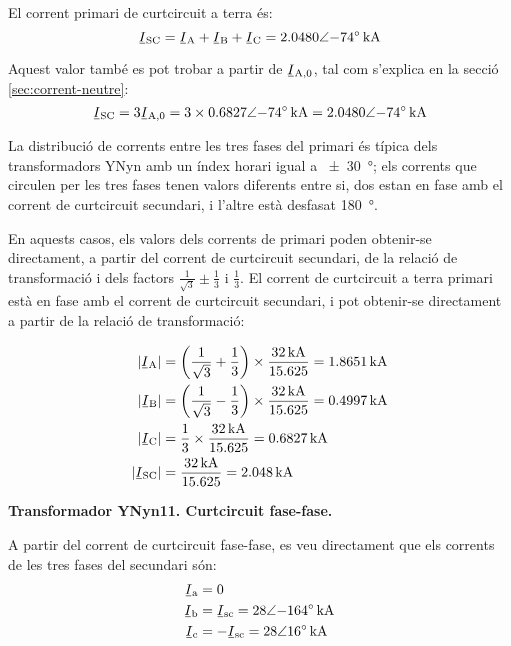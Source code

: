 \begin{exemple}[\CCasimSecTrafo{}]
    El corrent primari de curtcircuit a terra és:
    \[
        \cmplx{I}\ped{SC} = \cmplx{I}\ped{A} + \cmplx{I}\ped{B} + \cmplx{I}\ped{C} = \complexqty{2,0480:-74}{kA}
    \]

    Aquest valor també es pot trobar a partir de $\cmplx{I}\ped{A,0}$, tal com s'explica en la secció \vref{sec:corrent-neutre}:
       \[
        \cmplx{I}\ped{SC} = 3 \cmplx{I}\ped{A,0} = 3 \times \complexqty{0,6827:-74}{kA} = \complexqty{2,0480:-74}{kA}
    \]

    La distribució de corrents entre les tres fases del primari és típica dels transformadors YNyn amb un índex horari igual a \qty{+-30}{\degree}; els corrents que circulen per les tres fases tenen valors diferents entre si, dos estan en fase amb el corrent de curtcircuit secundari, i l'altre està desfasat \qty{180}{\degree}.

    En aquests casos, els valors dels corrents de primari poden obtenir-se directament, a partir del corrent de curtcircuit secundari, de la relació de transformació i dels factors $\frac{1}{\sqrt{3}} \pm \frac{1}{3}$ i $\frac{1}{3}$. El corrent de curtcircuit a terra primari està en fase amb el corrent de curtcircuit secundari, i pot obtenir-se directament a partir de la relació de transformació:
    
    \begin{align*}
        |\cmplx{I}\ped{A}| &= \left(\frac{1}{\sqrt{3}}+\frac{1}{3}\right) \times \frac{\qty{32}{kA}}{\num{15,625}} = \qty{1,8651}{kA} \\
        |\cmplx{I}\ped{B}| &= \left(\frac{1}{\sqrt{3}}-\frac{1}{3}\right) \times \frac{\qty{32}{kA}}{\num{15,625}} = \qty{0,4997}{kA} \\
        |\cmplx{I}\ped{C}| &= \frac{1}{3} \times \frac{\qty{32}{kA}}{\num{15,625}} = \qty{0,6827}{kA} \\
        |\cmplx{I}\ped{SC}| &= \frac{\qty{32}{kA}}{\num{15,625}} = \qty{2,048}{kA}
    \end{align*}


    \textbf{ Transformador YNyn11. Curtcircuit fase-fase.}

    \begin{center}
       
    \end{center}

    A partir del corrent de curtcircuit fase-fase, es veu directament que els corrents de les tres fases del secundari són:
    \begin{align*}
        \cmplx{I}\ped{a} &= 0  \\
        \cmplx{I}\ped{b} &= \cmplx{I}\ped{sc} = \complexqty{28:-164}{kA}  \\
        \cmplx{I}\ped{c} &= -\cmplx{I}\ped{sc} = \complexqty{28:16}{kA}
    \end{align*}


\end{exemple}
